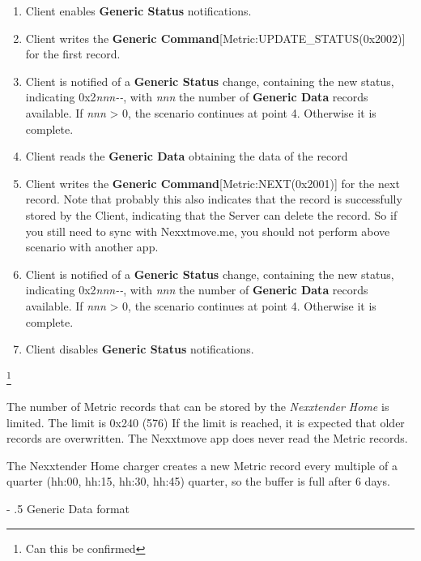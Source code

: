 \documentclass[a4paper]{article}
\makeatletter
\renewcommand\paragraph{%
   \@startsection{paragraph}{4}{0mm}%
      {-\baselineskip}%
      {.5\baselineskip}%
      {\normalfont\normalsize\bfseries}}
\makeatother
\begin{document}
\begin{enumerate}
	
	\item
	      Client enables \textbf{Generic Status} notifications.
	\item
	      Client writes the \textbf{Generic 	Command}{[}Metric:UPDATE\_STATUS(0x2002){]} 
	      for the first record.
	\item
	      Client is notified of a \textbf{Generic Status} change, containing the new status, 
	      indicating 0x2\emph{nnn-\/-}, with \emph{nnn} the number of \textbf{Generic Data} 
	      records available. If \emph{nnn} \textgreater{} 0, the scenario continues at point 4. 
	      Otherwise it is complete.
	\item
	      Client reads the \textbf{Generic Data} obtaining the data of the record
	\item
	      Client writes the \textbf{Generic Command}{[}Metric:NEXT(0x2001){]}
	      for the next record. 
	      Note that probably this also indicates that the record is successfully stored by the Client, 
	      indicating that the Server can delete the record. 
	      So if you still need to sync with Nexxtmove.me, 
           you should not perform above scenario with another app.
	\item
	      Client is notified of a \textbf{Generic Status} change, containing the new status, 
	      indicating 0x2\emph{nnn-\/-}, with \emph{nnn} the number of
	      \textbf{Generic Data} records available. 
	      If \emph{nnn} \textgreater{} 0, the scenario continues at point 4.
	      Otherwise it is complete.
	\item
	      Client disables \textbf{Generic Status} notifications.
\end{enumerate}

\footnote{Can this be confirmed}

The number of Metric records that can be stored by the \emph{Nexxtender Home} is limited. 
The limit is 0x240 (576)
If the limit is reached, it is expected that older records are overwritten.
The Nexxtmove app does never read the Metric records.

The Nexxtender Home charger creates a new Metric record every multiple of a quarter (hh:00, hh:15, hh:30, hh:45) quarter, so the  buffer is full after 6 days.


\paragraph{Generic Data format}
\label{generic_data_format_1}
\end{document}
